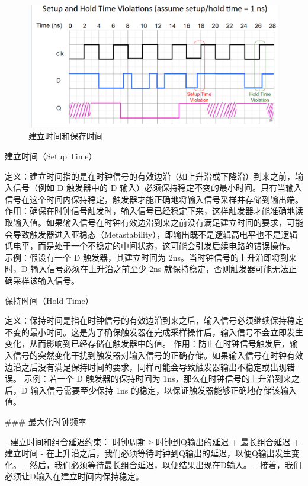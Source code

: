 \documentclass{ctexart}
\begin{document}
\begin{figure}
    \centering
    \includegraphics[width=0.5\linewidth]{建立时间和保存时间.png}
    \caption{建立时间和保存时间}
    \label{fig:enter-label}
\end{figure}
建立时间（Setup Time）\par
定义：建立时间指的是在时钟信号的有效边沿（如上升沿或下降沿）到来之前，输入信号（例如 D 触发器中的 D 输入）必须保持稳定不变的最小时间。只有当输入信号在这个时间内保持稳定，触发器才能正确地将输入信号采样并存储到输出端。
作用：确保在时钟信号触发时，输入信号已经稳定下来，这样触发器才能准确地读取输入值。如果输入信号在时钟有效边沿到来之前没有满足建立时间的要求，可能会导致触发器进入亚稳态（Metastability），即输出既不是逻辑高电平也不是逻辑低电平，而是处于一个不稳定的中间状态，这可能会引发后续电路的错误操作。
示例：假设有一个 D 触发器，其建立时间为 2ns。当时钟信号的上升沿即将到来时，D 输入信号必须在上升沿之前至少 2ns 就保持稳定，否则触发器可能无法正确采样该输入信号。\par
保持时间（Hold Time）\par
定义：保持时间是指在时钟信号的有效边沿到来之后，输入信号必须继续保持稳定不变的最小时间。这是为了确保触发器在完成采样操作后，输入信号不会立即发生变化，从而影响到已经存储在触发器中的值。
作用：防止在时钟信号触发后，输入信号的突然变化干扰到触发器对输入信号的正确存储。如果输入信号在时钟有效边沿之后没有满足保持时间的要求，同样可能会导致触发器输出不稳定或出现错误。
示例：若一个 D 触发器的保持时间为 1ns，那么在时钟信号的上升沿到来之后，D 输入信号需要至少保持 1ns 的稳定，以保证触发器能够正确地存储该输入值。\par




### 最大化时钟频率  \par
- 建立时间和组合延迟约束：  
时钟周期 ≥ 时钟到Q输出的延迟 + 最长组合延迟 + 建立时间  
    - 在上升沿之后，我们必须等待时钟到Q输出的延迟，以便Q输出发生变化。  
    - 然后，我们必须等待最长组合延迟，以便结果出现在D输入。  
    - 接着，我们必须让D输入在建立时间内保持稳定。  
\end{document}
